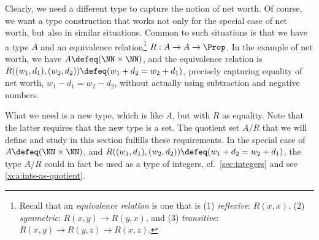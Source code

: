 Clearly, we need a different type to capture the notion of net worth.
Of course, we want a type construction that works not only for
the special case of net worth, but also in similar situations.
Common to such situations is that we have a type $A$ and an
equivalence relation\footnote{\label{ft:equiv-rel}%
  Recall that an \emph{equivalence relation} is one that is
  (1) \emph{reflexive}: $R(x,x)$,
  (2) \emph{symmetric}: $R(x,y) \to R(y,x)$, and
  (3) \emph{transitive}: $R(x,y) \to R(y,z) \to R(x,z)$.}
$R : A\to A\to \Prop$. In the example of net worth, we have
$A\defeq(\NN\times\NN)$, and the equivalence relation is
$R((w_1,d_1),(w_2,d_2)) \defeq  (w_1+d_2 = w_2 + d_1)$,
precisely capturing equality of net worth, $w_1 - d_1 = w_2 - d_2$,
without actually using subtraction and negative numbers.

What we need is a new type, which is like $A$, but with $R$ as equality.
Note that the latter requires that the new type is a set.
The quotient set $A/R$ that we will define and study in this
section fulfills these requirements.
In the special case of $A\defeq(\NN\times\NN)$, and
$R((w_1,d_1),(w_2,d_2)) \defeq  (w_1+d_2 = w_2 + d_1)$,
the type $A/R$ could in fact be used as a type of integers,
cf.\ \cref{sec:integers} and see \cref{xca:ints-as-quotient}.

